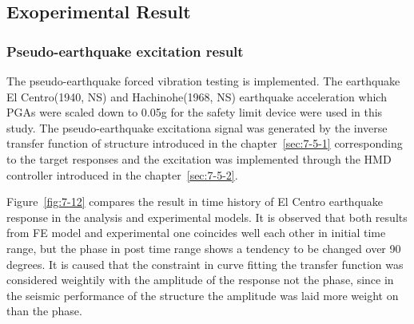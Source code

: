 \subsection{Exoperimental Result}
\subsubsection{Pseudo-earthquake excitation result}
The pseudo-earthquake forced vibration testing is implemented. The earthquake El Centro(1940, NS) and Hachinohe(1968, NS) earthquake acceleration which PGAs were scaled down to 0.05g for the safety limit device were used in this study. The pseudo-earthquake excitationa signal was generated by the inverse transfer function of structure introduced in the chapter~\ref{sec:7-5-1} corresponding to the target responses and the excitation was implemented through the HMD controller introduced in the chapter~\ref{sec:7-5-2}.

Figure~\ref{fig:7-12} compares the result in time history of El Centro earthquake response in the analysis and experimental models. It is observed that both results from FE model and experimental one coincides well each other in initial time range, but the phase in post time range shows a tendency to be changed over 90 degrees. It is caused that the constraint in curve fitting the transfer function was considered weightily with the amplitude of the response not the phase, since in the seismic performance of the structure the amplitude was laid more weight on than the phase.

